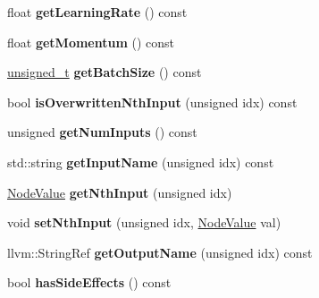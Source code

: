 \begin{DoxyCompactItemize}
float {\bfseries get\+Learning\+Rate} () const
\item 
\mbox{\label{classglow_1_1_s_g_d_node_a39c6dd123ca8b50e49e7253f32e31bd0}} 
float {\bfseries get\+Momentum} () const
\item 
\mbox{\label{classglow_1_1_s_g_d_node_a1aa20342ede03f3c8b881b11706bb420}} 
\hyperlink{namespaceglow_a0ca574644e1e42ef193a9947fb4d8911}{unsigned\+\_\+t} {\bfseries get\+Batch\+Size} () const
\item 
\mbox{\label{classglow_1_1_s_g_d_node_a3d76639ef57e6849125417d2c4321ebb}} 
bool {\bfseries is\+Overwritten\+Nth\+Input} (unsigned idx) const
\item 
\mbox{\label{classglow_1_1_s_g_d_node_a63f8666cb00c8b6ddddbe87b8cbdaf84}} 
unsigned {\bfseries get\+Num\+Inputs} () const
\item 
\mbox{\label{classglow_1_1_s_g_d_node_a57379b33ba700662d9456c85032a739a}} 
std\+::string {\bfseries get\+Input\+Name} (unsigned idx) const
\item 
\mbox{\label{classglow_1_1_s_g_d_node_af17f18545557a7ff2096aeb5975b5c9f}} 
\hyperlink{structglow_1_1_node_value}{Node\+Value} {\bfseries get\+Nth\+Input} (unsigned idx)
\item 
\mbox{\label{classglow_1_1_s_g_d_node_a79530677ea350f3b6fccea64737eeb75}} 
void {\bfseries set\+Nth\+Input} (unsigned idx, \hyperlink{structglow_1_1_node_value}{Node\+Value} val)
\item 
\mbox{\label{classglow_1_1_s_g_d_node_ad0e7d564ca49964752045d48a5766ac3}} 
llvm\+::\+String\+Ref {\bfseries get\+Output\+Name} (unsigned idx) const
\item 
\mbox{\label{classglow_1_1_s_g_d_node_a0fe40a5b1fc9eaf8155361812ebc5449}} 
bool {\bfseries has\+Side\+Effects} () const
\item 
\mbox{\label{classglow_1_1_s_g_d_node_aa881ae307f63fa9c18617ff9650888d4}} 

\end{DoxyCompactItemize}
